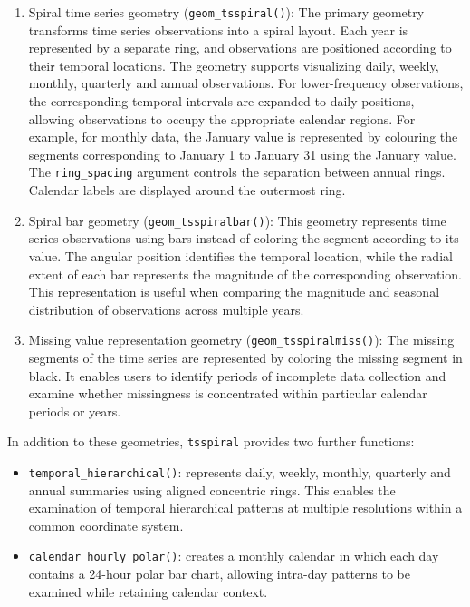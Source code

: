 \documentclass[
  12pt,
  a4paper,
]{article}
\begin{document}
\begin{enumerate}
\def\labelenumi{\roman{enumi}.}
\item
  Spiral time series geometry (\texttt{geom\_tsspiral()}): The primary
  geometry transforms time series observations into a spiral layout.
  Each year is represented by a separate ring, and observations are
  positioned according to their temporal locations. The geometry
  supports visualizing daily, weekly, monthly, quarterly and annual
  observations. For lower-frequency observations, the corresponding
  temporal intervals are expanded to daily positions, allowing
  observations to occupy the appropriate calendar regions. For example,
  for monthly data, the January value is represented by colouring the
  segments corresponding to January 1 to January 31 using the January
  value. The \texttt{ring\_spacing} argument controls the separation
  between annual rings. Calendar labels are displayed around the
  outermost ring.
\item
  Spiral bar geometry (\texttt{geom\_tsspiralbar()}): This geometry
  represents time series observations using bars instead of coloring the
  segment according to its value. The angular position identifies the
  temporal location, while the radial extent of each bar represents the
  magnitude of the corresponding observation. This representation is
  useful when comparing the magnitude and seasonal distribution of
  observations across multiple years.
\item
  Missing value representation geometry (\texttt{geom\_tsspiralmiss()}):
  The missing segments of the time series are represented by coloring
  the missing segment in black. It enables users to identify periods of
  incomplete data collection and examine whether missingness is
  concentrated within particular calendar periods or years.
\end{enumerate}

In addition to these geometries, \texttt{tsspiral} provides two further
functions:

\begin{itemize}
\item
  \texttt{temporal\_hierarchical()}: represents daily, weekly, monthly,
  quarterly and annual summaries using aligned concentric rings. This
  enables the examination of temporal hierarchical patterns at multiple
  resolutions within a common coordinate system.
\item
  \texttt{calendar\_hourly\_polar()}: creates a monthly calendar in
  which each day contains a 24-hour polar bar chart, allowing intra-day
  patterns to be examined while retaining calendar context.
\end{itemize}
\end{document}
